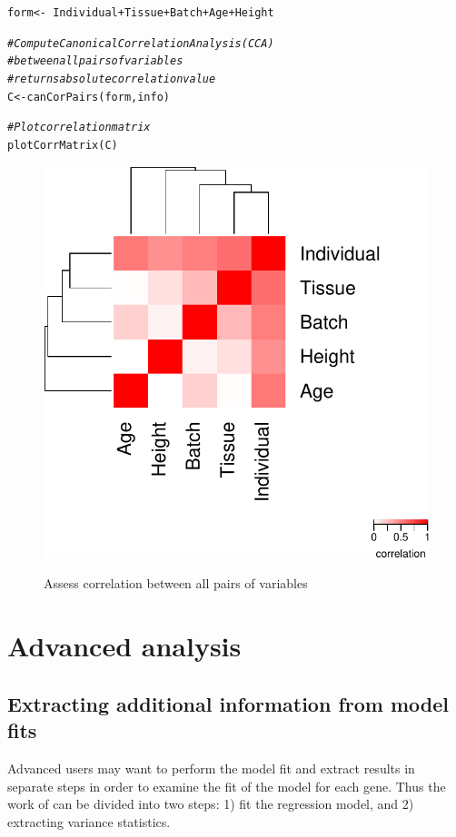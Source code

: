\documentclass[12pt]{article}\usepackage[]{graphicx}\usepackage[]{xcolor}
\newcommand{\hlcom}[1]{\textcolor[rgb]{0.502,0.502,0.502}{\textit{#1}}}%
\newcommand{\hlopt}[1]{\textcolor[rgb]{0,0,0}{#1}}%
\newcommand{\hlstd}[1]{\textcolor[rgb]{0.251,0.251,0.251}{#1}}%
\newcommand{\hlkwb}[1]{\textcolor[rgb]{0,0,0}{#1}}%
\newcommand{\hlkwd}[1]{\textcolor[rgb]{0.878,0.439,0.125}{#1}}%
\newenvironment{knitrout}{}{} %
\begin{document}
\begin{knitrout}
\color{fgcolor}\begin{kframe}
\begin{alltt}
\hlstd{form} \hlkwb{<-} \hlopt{~} \hlstd{Individual} \hlopt{+} \hlstd{Tissue} \hlopt{+} \hlstd{Batch} \hlopt{+} \hlstd{Age} \hlopt{+} \hlstd{Height}

\hlcom{# Compute Canonical Correlation Analysis (CCA)}
\hlcom{# between all pairs of variables}
\hlcom{# returns absolute correlation value}
\hlstd{C} \hlkwb{<-} \hlkwd{canCorPairs}\hlstd{(form, info)}

\hlcom{# Plot correlation matrix}
\hlkwd{plotCorrMatrix}\hlstd{(C)}
\end{alltt}
\end{kframe}
\end{knitrout}

\begin{figure}[h]
\centering
\caption{Assess correlation between all pairs of variables}
\includegraphics[width=.5\textwidth]{figure/canCorPairs-1}
\label{fig:canCorPairs}
\end{figure}



\pagebreak
\section{Advanced analysis}

\subsection{Extracting additional information from model fits}

Advanced users may want to perform the model fit and extract results in separate steps in order to examine the fit of the model for each gene.  Thus the work of  can be divided into two steps: 1) fit the regression model, and 2) extracting variance statistics. \\    
\end{document}
